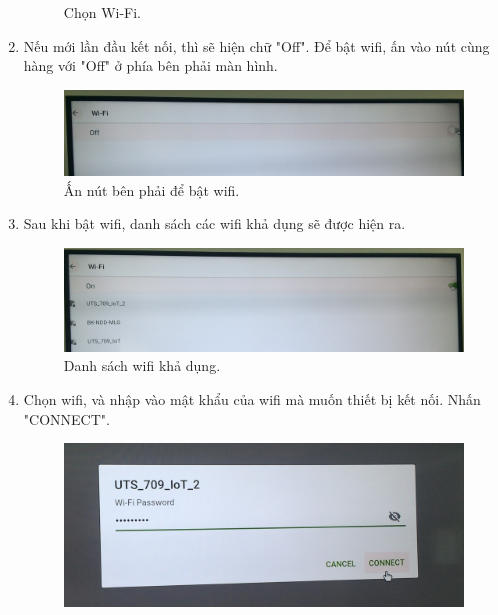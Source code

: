 \begin{enumerate}
\begin{center}
\begin{figure}[htp]
\caption{Chọn Wi-Fi.}
\label{refhinh1}
\end{figure}
\end{center}
\item Nếu mới lần đầu kết nối, thì sẽ hiện chữ "Off". Để bật wifi, ấn vào nút cùng hàng với "Off" ở phía bên phải màn hình.
\begin{center}
\begin{figure}[htp]
\begin{center}
\includegraphics[scale=0.12]{image3/buoc3s5.JPG}
\end{center}
\caption{Ấn nút bên phải để bật wifi.}
\label{refhinh1}
\end{figure}
\end{center}
\newpage
\item Sau khi bật wifi, danh sách các wifi khả dụng sẽ được hiện ra.
\begin{center}
\begin{figure}[htp]
\begin{center}
\includegraphics[scale=0.12]{image3/buoc3s6.JPG}
\end{center}
\caption{Danh sách wifi khả dụng.}
\label{refhinh1}
\end{figure}
\end{center}
\item Chọn wifi, và nhập vào mật khẩu của wifi mà muốn thiết bị kết nối. Nhấn "CONNECT".
\begin{center}
\begin{figure}[htp]
\begin{center}
\includegraphics[scale=0.12]{image3/buoc3s7.JPG}

\end{center}
\end{figure}
\end{center}
\end{enumerate}
